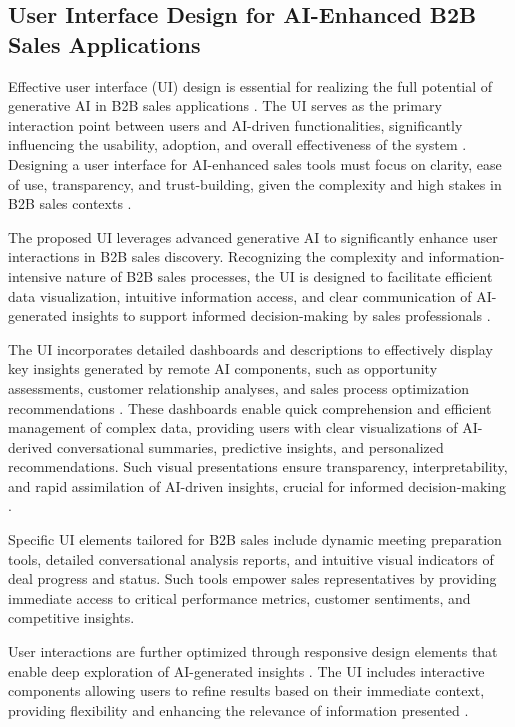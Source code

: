 \subsection{User Interface Design for AI-Enhanced B2B Sales Applications}

Effective user interface (UI) design is essential for realizing the full potential of generative AI in B2B sales applications \cite{interaction2016business}. The UI serves as the primary interaction point between users and AI-driven functionalities, significantly influencing the usability, adoption, and overall effectiveness of the system \cite{luera2024surveyuserinterface}. Designing a user interface for AI-enhanced sales tools must focus on clarity, ease of use, transparency, and trust-building, given the complexity and high stakes in B2B sales contexts \cite{rodriguez2020digitalization}.

The proposed UI leverages advanced generative AI to significantly enhance user interactions in B2B sales discovery. Recognizing the complexity and information-intensive nature of B2B sales processes, the UI is designed to facilitate efficient data visualization, intuitive information access, and clear communication of AI-generated insights to support informed decision-making by sales professionals \cite{costa2022interaction}.

The UI incorporates detailed dashboards and descriptions to effectively display key insights generated by remote AI components, such as opportunity assessments, customer relationship analyses, and sales process optimization recommendations \cite{futrell2011fundamentals}. These dashboards enable quick comprehension and efficient management of complex data, providing users with clear visualizations of AI-derived conversational summaries, predictive insights, and personalized recommendations. Such visual presentations ensure transparency, interpretability, and rapid assimilation of AI-driven insights, crucial for informed decision-making \cite{interaction2016business}.

Specific UI elements tailored for B2B sales include dynamic meeting preparation tools, detailed conversational analysis reports, and intuitive visual indicators of deal progress and status. Such tools empower sales representatives by providing immediate access to critical performance metrics, customer sentiments, and competitive insights. 

User interactions are further optimized through responsive design elements that enable deep exploration of AI-generated insights \cite{beltrao2022userinterface}. The UI includes interactive components allowing users to refine results based on their immediate context, providing flexibility and enhancing the relevance of information presented \cite{costa2024towards}.

